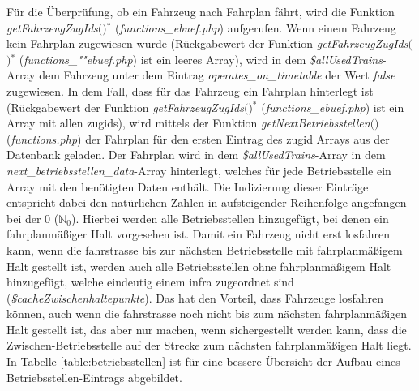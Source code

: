 Für die Überprüfung, ob ein Fahrzeug nach Fahrplan fährt, wird die Funktion \textit{get\-Fahrzeug\-ZugIds$($$)$}$^\ast$ (\textit{functions\_ebuef.php}) aufgerufen. Wenn einem Fahrzeug kein Fahrplan zugewiesen wurde (Rückgabewert der Funktion \textit{get\-Fahrzeug\-ZugIds$($$)$}$^\ast$ (\textit{func\-tions\_""ebuef\-.php}) ist ein leeres Array), wird in dem \textit{\$allUsedTrains}-Array dem Fahrzeug unter dem Eintrag \textit{operates\_on\_timetable} der Wert \textit{false} zugewiesen. In dem Fall, dass für das Fahrzeug ein Fahrplan hinterlegt ist (Rückgabewert der Funktion \textit{get\-Fahrzeug\-ZugIds$($$)$}$^\ast$ (\textit{functions\_ebuef.php}) ist ein Array mit allen \Gls{zugid}s), wird mittels der Funktion \textit{getNextBetriebsstellen$($$)$} (\textit{functions.php}) der Fahrplan für den ersten Eintrag des \Gls{zugid} Arrays aus der Datenbank geladen. Der Fahrplan wird in dem \textit{\$all\-Used\-Trains}-Array in dem \textit{next\_betriebsstellen\_data}-Array hinterlegt, welches für jede Betriebsstelle ein Array mit den benötigten Daten enthält. Die Indizierung dieser Einträge entspricht dabei den natürlichen Zahlen in aufsteigender Reihenfolge angefangen bei der 0 ($\mathbb{N}_0$). Hierbei werden alle Betriebsstellen hinzugefügt, bei denen ein fahrplanmäßiger Halt vorgesehen ist. Damit ein Fahrzeug nicht erst losfahren kann, wenn die \Gls{fahrstrasse} bis zur nächsten Betriebsstelle mit fahrplanmäßigem Halt gestellt ist, werden auch alle Betriebsstellen ohne fahrplanmäßigem Halt hinzugefügt, welche eindeutig einem \ac{infra} zugeordnet sind (\textit{\$cacheZwischenhaltepunkte}). Das hat den Vorteil, dass Fahrzeuge losfahren können, auch wenn die \Gls{fahrstrasse} noch nicht bis zum nächsten fahrplanmäßigen Halt gestellt ist, das aber nur machen, wenn sichergestellt werden kann, dass die Zwischen-Betriebsstelle auf der Strecke zum nächsten fahrplanmäßigen Halt liegt. In Tabelle \ref{table:betriebsstellen} ist für eine bessere Übersicht der Aufbau eines Betriebsstellen-Eintrags abgebildet.
